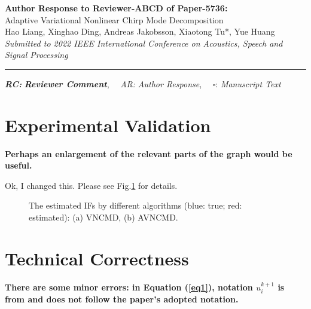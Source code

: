 \documentclass{article}
\def\lettertitle{Author Response to Reviewer-ABCD of Paper-5736:}
\def\papertitle{Adaptive Variational Nonlinear Chirp Mode Decomposition}
\def\authors{Hao Liang, Xinghao Ding, Andreas Jakobsson, Xiaotong Tu*, Yue Huang}
\def\journal{Submitted to 2022 IEEE International Conference on Acoustics, Speech and Signal Processing}
\begin{document}
	
{\Large\bf \lettertitle}\\[1em]
{\LARGE \papertitle}\\[1em]
{\authors}\\
{\it \journal}\\
\hrule

\hfill  {\bfseries \textit{RC:}} \textbf{\textit{Reviewer Comment}},\(\quad\) \textit{AR:} \emph{Author Response}, \(\quad\square\): \textit{Manuscript Text}  %



\section{Experimental Validation}
\RC \rm \bf Perhaps an enlargement of the relevant parts of the graph would be useful.

\AR \rm Ok, I changed this. Please see Fig.\ref{fig1} for details.
\begin{figure}[h] 
	\centering
	\caption{The estimated IFs by different algorithms (blue: true; red: estimated): (a) VNCMD, (b) AVNCMD.}
	\label{fig1}
\end{figure}

\section{Technical Correctness}
\RC \rm \bf There are some minor errors: in Equation (\ref{eq1}), notation $u_i^{k+1}$ is from \cite{chen2017nonlinear} and does not follow the paper's adopted notation.
\end{document}
